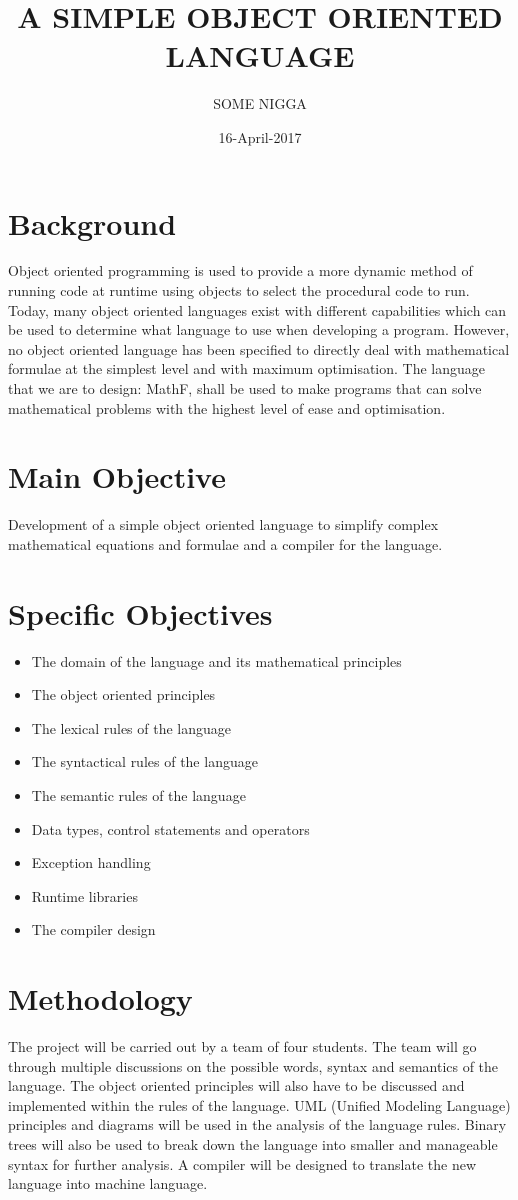 \documentclass{article}
\begin{document}
\title{A SIMPLE OBJECT ORIENTED LANGUAGE}
\date{16-April-2017}
\author{SOME NIGGA}

\maketitle
\newpage

\section{Background}
Object oriented programming is used to provide a more dynamic method of running code at runtime using objects to select the procedural code to run. Today, many object oriented languages exist with different capabilities which can be used to determine what language to use when developing a program. However, no object oriented language has been specified to directly deal with mathematical formulae at the simplest level and with maximum optimisation. The language that we are to design: MathF, shall be used to make programs that can solve mathematical problems with the highest level of ease and optimisation.

\section{Main Objective}
Development of a simple object oriented language to simplify complex mathematical equations and formulae and a compiler for the language.

\section{Specific Objectives}
\begin{itemize}
\item
The domain of the language and its mathematical principles
\item
The object oriented principles
\item
The lexical rules of the language
\item
The syntactical rules of the language
\item
The semantic rules of the language
\item
Data types, control statements and operators
\item
Exception handling
\item
Runtime libraries
\item
The compiler design
\end{itemize}

\section{Methodology}
The project will be carried out by a team of four students. The team will go through multiple discussions on the possible words, syntax and semantics of the language. The object oriented principles will also have to be discussed and implemented within the rules of the language. UML (Unified Modeling Language) principles and diagrams will be used in the analysis of the language rules. Binary trees will also be used to break down the language into smaller and manageable syntax for further analysis. A compiler will be designed to translate the new language into machine language.
\end{document}
